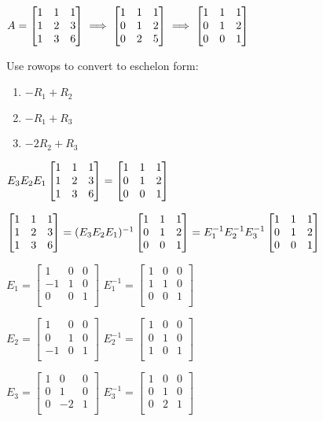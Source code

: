\documentclass[letterpaper,12pt,fleqn]{article}
\begin{document}
\begin{example}
  $A=\begin{bmatrix} 1 & 1 & 1 \\ 1 & 2 & 3 \\ 1 & 3 & 6 \end{bmatrix}\implies
  \begin{bmatrix} 1 & 1 & 1 \\ 0 & 1 & 2 \\ 0 & 2 & 5 \end{bmatrix}
  \implies\begin{bmatrix} 1 & 1 & 1 \\ 0 & 1 & 2 \\ 0 & 0 & 1 \end{bmatrix}$

  Use rowops to convert to eschelon form:
  \begin{enumerate}
  \item $-R_1+R_2$
  \item $-R_1+R_3$
  \item $-2R_2+R_3$
  \end{enumerate}

  $E_3E_2E_1\begin{bmatrix} 1 & 1 & 1 \\ 1 & 2 & 3 \\ 1 & 3 & 6 \end{bmatrix}=\begin{bmatrix} 1 & 1 & 1 \\ 0 & 1 & 2 \\ 0 & 0 & 1 \end{bmatrix}$

  $\begin{bmatrix} 1 & 1 & 1 \\ 1 & 2 & 3 \\ 1 & 3 & 6 \end{bmatrix}=(E_3E_2E_1)^{-1}\begin{bmatrix} 1 & 1 & 1 \\ 0 & 1 & 2 \\ 0 & 0 & 1 \end{bmatrix}=E_1^{-1}E_2^{-1}E_3^{-1}\begin{bmatrix} 1 & 1 & 1 \\ 0 & 1 & 2 \\ 0 & 0 & 1 \end{bmatrix}$

  $E_1=\begin{bmatrix}
  1 & 0 & 0 \\
  -1 & 1 & 0 \\
  0 & 0 & 1 \\
  \end{bmatrix}$\hspace{4ex}
  $E_1^{-1}=\begin{bmatrix}
  1 & 0 & 0 \\
  1 & 1 & 0 \\
  0 & 0 & 1 \\
  \end{bmatrix}$

  $E_2=\begin{bmatrix}
  1 & 0 & 0 \\
  0 & 1 & 0 \\
  -1 & 0 & 1 \\
  \end{bmatrix}$\hspace{4ex}
  $E_2^{-1}=\begin{bmatrix}
  1 & 0 & 0 \\
  0 & 1 & 0 \\
  1 & 0 & 1 \\
  \end{bmatrix}$

  $E_3=\begin{bmatrix}
  1 & 0 & 0 \\
  0 & 1 & 0 \\
  0 & -2 & 1 \\
  \end{bmatrix}$\hspace{4ex}
  $E_3^{-1}=\begin{bmatrix}
  1 & 0 & 0 \\
  0 & 1 & 0 \\
  0 & 2 & 1 \\
  \end{bmatrix}$


\end{example}
\end{document}
